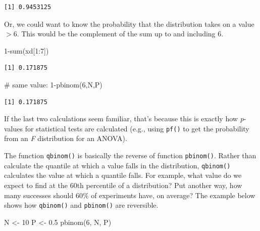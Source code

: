 \documentclass[
  13,
  letterpaper,
]{report}
\newenvironment{Shaded}{\begin{snugshade}}{\end{snugshade}}
\newcommand{\CommentTok}[1]{\textcolor[rgb]{0.37,0.37,0.37}{#1}}
\newcommand{\DecValTok}[1]{\textcolor[rgb]{0.68,0.00,0.00}{#1}}
\newcommand{\FloatTok}[1]{\textcolor[rgb]{0.68,0.00,0.00}{#1}}
\newcommand{\FunctionTok}[1]{\textcolor[rgb]{0.28,0.35,0.67}{#1}}
\newcommand{\NormalTok}[1]{\textcolor[rgb]{0.00,0.23,0.31}{#1}}
\newcommand{\OtherTok}[1]{\textcolor[rgb]{0.00,0.23,0.31}{#1}}
\newcommand{\SpecialCharTok}[1]{\textcolor[rgb]{0.37,0.37,0.37}{#1}}
\begin{document}
\begin{verbatim}
[1] 0.9453125
\end{verbatim}

Or, we could want to know the probability that the distribution takes on
a value \(>6\). This would be the complement of the sum up to and
including 6.

\begin{Shaded}
\begin{Highlighting}[]
\DecValTok{1}\SpecialCharTok{{-}}\FunctionTok{sum}\NormalTok{(xd[}\DecValTok{1}\SpecialCharTok{:}\DecValTok{7}\NormalTok{])}
\end{Highlighting}
\end{Shaded}

\begin{verbatim}
[1] 0.171875
\end{verbatim}

\begin{Shaded}
\begin{Highlighting}[]
\CommentTok{\# same value:}
\DecValTok{1}\SpecialCharTok{{-}}\FunctionTok{pbinom}\NormalTok{(}\DecValTok{6}\NormalTok{,N,P)}
\end{Highlighting}
\end{Shaded}

\begin{verbatim}
[1] 0.171875
\end{verbatim}

If the last two calculations seem familiar, that's because this is
exactly how \emph{p}-values for statistical tests are calculated (e.g.,
using \texttt{pf()} to get the probability from an \emph{F} distribution
for an ANOVA).

The function \texttt{qbinom()} is basically the reverse of function
\texttt{pbinom()}. Rather than calculate the quantile at which a value
falls in the distribution, \texttt{qbinom()} calculates the value at
which a quantile falls. For example, what value do we expect to find at
the 60th percentile of a distribution? Put another way, how many
successes should 60\% of experiments have, on average? The example below
shows how \texttt{qbinom()} and \texttt{pbinom()} are reversible.

\begin{Shaded}
\begin{Highlighting}[]
\NormalTok{N }\OtherTok{\textless{}{-}} \DecValTok{10}
\NormalTok{P }\OtherTok{\textless{}{-}} \FloatTok{0.5}
\FunctionTok{pbinom}\NormalTok{(}\DecValTok{6}\NormalTok{, N, P)}
\end{Highlighting}
\end{Shaded}
\end{document}
